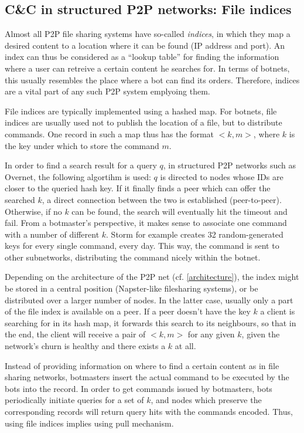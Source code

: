 \documentclass{llncs}
\begin{document}
\subsection{C\&C in structured P2P networks: File indices}
\label{distribution}
Almost all P2P file sharing systems have so-called {\it indices}, in
which they map a desired content to a location where it can be found
(IP address and port). An index can thus be considered as a ``lookup
table'' for finding the information where a user can retreive a
certain content he searches for. In terms of botnets, this usually
resembles the place where a bot can find its orders. Therefore,
indices are a vital part of any such P2P system emplyoing them.

File indices are typically implemented using a hashed map. For
botnets, file indices are usually used not to publish the location of
a file, but to distribute commands. One record in such a map thus has
the format $<k, m>$, where $k$ is the key under which to store the
command $m$.

In order to find a search result for a query $q$, in structured P2P
networks such as Overnet, the following algortihm is used: $q$ is
directed to nodes whose IDs are closer to the queried hash key. If it
finally finds a peer which can offer the searched $k$, a direct
connection between the two is established (peer-to-peer). Otherwise,
if no $k$ can be found, the search will eventually hit the timeout and
fail. From a botmaster's perspective, it makes sense to associate one
command with a number of different $k$. Storm for example creates 32
random-generated keys for every single command, every
day.\cite{wang2009systematic} This way, the command is sent to other
subnetworks, distributing the command nicely within the botnet.

Depending on the architecture of the P2P net (cf. \ref{architecture}),
the index might be stored in a central position (Napster-like
filesharing systems), or be distributed over a larger number of nodes.
In the latter case, usually only a part of the file index is available
on a peer. If a peer doesn't have the key $k$ a client is searching
for in its hash map, it forwards this search to its neighbours, so
that in the end, the client will receive a pair of $<k, m>$ for any
given $k$, given the network's churn is healthy and there exists a $k$
at all.

Instead of providing information on where to find a certain content as
in file sharing networks, botmasters insert the actual command to be
executed by the bots into the record.  In order to get commands issued
by botmasters, bots periodically initiate queries for a set of $k$,
and nodes which preserve the corresponding records will return query
hits with the commands encoded. Thus, using file indices implies using
pull mechanism. \cite{liang2006index}
\end{document}
